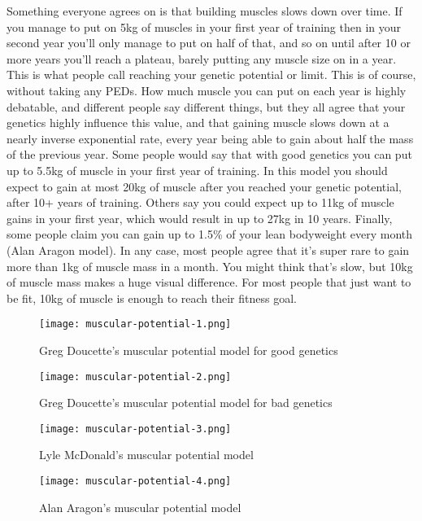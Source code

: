 \documentclass[openany, 12pt]{book}
\begin{document}
        Something everyone agrees on is that building muscles slows down over time. If you manage to put on 5kg of muscles in your first year of training then in your second year you'll only
        manage to put on half of that, and so on until after 10 or more years you'll reach a plateau, barely putting any muscle size on in a year. This is what people call reaching your genetic
        potential or limit. This is of course, without taking any PEDs. How much muscle you can put on each year is highly debatable, and different people say different things, but they all
        agree that your genetics
        highly influence this value, and that gaining muscle slows down at a nearly inverse exponential rate, every year being able to gain about half the mass of the previous year.
        Some people would say that with good genetics you can put up to 5.5kg of muscle in your first year of training. In this model you should expect to gain at most 20kg of muscle after you reached
        your genetic potential, after 10+ years of training. Others say you could expect up to 11kg of muscle gains in your first year, which would result in up to 27kg in 10 years.
        Finally, some people claim you can gain up to 1.5\% of your lean bodyweight every month (Alan Aragon model). In any case, most people agree that it's super rare to gain more than 1kg of muscle mass
        in a month. You might think that's slow, but 10kg of muscle mass makes a huge visual difference. For most people that just want to be fit, 10kg of muscle is enough to reach their fitness goal.

        \begin{figure}[h]
		\centering
		\texttt{[image: muscular-potential-1.png]}
		\caption{Greg Doucette’s muscular potential model for good genetics}
		\label{fig15}
	\end{figure}

        \begin{figure}[h]
		\centering
		\texttt{[image: muscular-potential-2.png]}
		\caption{Greg Doucette’s muscular potential model for bad genetics}
		\label{fig16}
	\end{figure}

        \begin{figure}[h]
		\centering
		\texttt{[image: muscular-potential-3.png]}
		\caption{Lyle McDonald's muscular potential model}
		\label{fig17}
	\end{figure}

        \begin{figure}[h!]
		\centering
		\texttt{[image: muscular-potential-4.png]}
		\caption{Alan Aragon's muscular potential model}
		\label{fig18}
	\end{figure}
        
\end{document}
